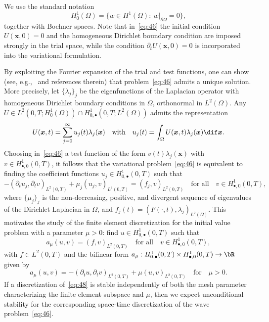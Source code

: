 \documentclass[addpoints,12pt,letter]{article}
\newcommand{\bx}{\boldsymbol{x}}
\newcommand{\la}{\lambda}
\newcommand{\nf}{\infty}
\newcommand{\Om}{\Omega}
\newcommand{\TF}{T}
\renewcommand{\d}{\dif}
\numberwithin{equation}{section}
\theoremstyle{definition}
\begin{document}
We use the standard notation
\[
H^{1}_{0}(\Om)=\{w\in H^{1}(\Om):\ w|_{\partial\Om}=0\},
\]
together with Bochner spaces.
Note that in~\eqref{eq:46} the initial condition $U(\bx,0)=0$ and the homogeneous Dirichlet boundary condition are imposed strongly in the trial space, while the condition $\partial_{t}U(\bx,0)=0$ is incorporated into the variational formulation.

By exploiting the Fourier expansion of the trial and test functions, one can show (see, e.g.,~\cite[\S 5]{StZa20} and references therein) that problem~\eqref{eq:46} admits a unique solution.
More precisely, let $\{\la_{j}\}_{j}$ be the eigenfunctions of the Laplacian operator with homogeneous Dirichlet boundary conditions in $\Om$, orthonormal in $L^{2}(\Om)$.
Any $U\in L^{2}(0,\TF ;H^{1}_{0}(\Om))\cap H^{1}_{0,\bullet}(0,\TF ;L^{2}(\Om))$ admits the representation
\[
U(\bx,t)=\sum_{j=0}^{\nf} u_{j}(t)\la_{j}(\bx)\quad\text{with}\quad u_{j}(t)=\int_{\Om} U(\bx,t)\la_{j}(\bx)\d\bx.
\]
Choosing in~\eqref{eq:46} a test function of the form $v(t)\la_{j}(\bx)$ with $v\in H^{1}_{\bullet,0}(0,\TF)$, it follows that the variational problem~\eqref{eq:46} is equivalent to finding the coefficient functions $u_{j}\in H^{1}_{0,\bullet}(0,\TF)$ such that
\[
-(\partial_{t} u_{j},\partial_{t} v)_{L^{2}(0,\TF )}+\mu_{j}(u_{j}, v)_{L^{2}(0,\TF)}=(f_{j}, v)_{L^{2}(0,\TF)}\quad\text{for all}\quad v\in H^{1}_{\bullet,0}(0,\TF),
\]
where $\{\mu_{j}\}_{j}$ is the non-decreasing, positive, and divergent sequence of eigenvalues of the Dirichlet Laplacian in $\Om$, and $f_{j}(t)=(F(\cdot,t),\la_{j})_{L^{2}(\Om)}$.
This motivates the study of the finite element discretization for the initial value problem with a parameter $\mu>0$: find $u\in H_{0,\bullet}^{1}(0,\TF )$ such that
\begin{equation}\label{eq:47}
a_{\mu}(u,v)=(f,v)_{L^{2}(0,\TF )}\quad\text{for all}\quad v\in H^{1}_{\bullet,0}(0,\TF),
\end{equation}
with $f\in L^{2}(0,\TF)$ and the bilinear form $a_{\mu}: H^{1}_{0,\bullet}(0,\TF)\times H^{1}_{\bullet,0}(0,\TF)\to\bR$ given by
\begin{equation}\label{eq:48}
a_{\mu}(u,v)=-(\partial_{t} u,\partial_{t} v)_{L^{2}(0,\TF)}+\mu (u,v)_{L^{2}(0,\TF)}\quad\text{for}\quad\mu>0.
\end{equation}
If a discretization of~\eqref{eq:48} is stable independently of both the mesh parameter characterizing the finite element subspace and $\mu$, then we expect unconditional stability for the corresponding space-time discretization of the wave problem~\eqref{eq:46}.
\end{document}
